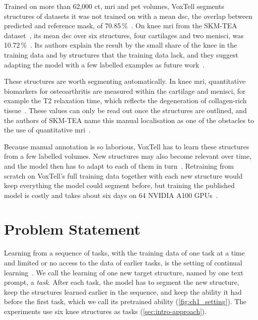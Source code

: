 Trained on more than 62{,}000 \gls{ct}, \gls{mri} and \gls{pet} volumes, VoxTell segments structures of datasets it was not trained on with a mean \gls{dsc}, the overlap between predicted and reference mask, of 70.85\,\%~\cite[Table~1]{rokuss2025voxtellfreetextpromptableuniversal}.
On knee \gls{mri} from the SKM-TEA dataset~\cite{desai2021skmtea}, its mean \gls{dsc} over six structures, four cartilages and two menisci, was 10.72\,\%~\cite[Suppl.~Table~9]{rokuss2025voxtellfreetextpromptableuniversal}.
Its authors explain the result by the small share of the knee in the training data and by structures that the training data lack, and they suggest adapting the model with a few labelled examples as future work~\cite[Sec.~6]{rokuss2025voxtellfreetextpromptableuniversal}.

These structures are worth segmenting automatically.
In knee \gls{mri}, quantitative biomarkers for osteoarthritis are measured within the cartilage and menisci, for example the T2 relaxation time, which reflects the degeneration of collagen-rich tissue~\cite{desai2021skmtea}.
These values can only be read out once the structures are outlined, and the authors of SKM-TEA name this manual localisation as one of the obstacles to the use of quantitative \gls{mri}~\cite{desai2021skmtea}.

Because manual annotation is so laborious, VoxTell has to learn these structures from a few labelled volumes.
New structures may also become relevant over time, and the model then has to adapt to each of them in turn~\cite{qazi2026clmedicalimaging}. 
Retraining from scratch on VoxTell's full training data together with each new structure would keep everything the model could segment before, but training the published model is costly and takes about six days on 64 NVIDIA A100 GPUs~\cite[p.~5]{rokuss2025voxtellfreetextpromptableuniversal}.

\section{Problem Statement}
\label{sec:intro-problem}

Learning from a sequence of tasks, with the training data of one task at a time and limited or no access to the data of earlier tasks, is the setting of continual learning~\cite[Sec.~2]{delange2022}.
We call the learning of one new target structure, named by one text prompt, a \emph{task}.
After each task, the model has to segment the new structure, keep the structures learned earlier in the sequence, and keep the ability it had before the first task, which we call its pretrained ability (\cref{fig:ch1_setting}).
The experiments use six knee structures as tasks (\cref{sec:intro-approach}).

